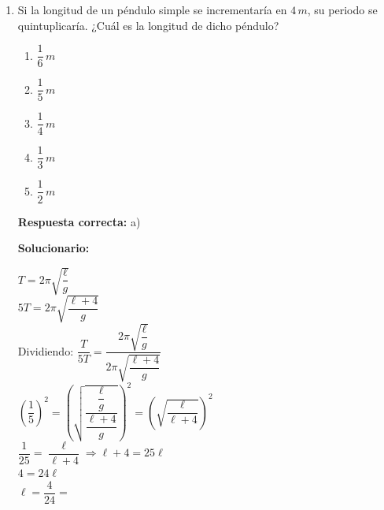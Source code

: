 \begin{enumerate}[resume]
	\textbf{Respuesta correcta:} d)
	
	\vspace{2mm}
	\textbf{Solucionario:}
	
	$Q = C_e \cdot m \cdot \Delta T$ 
	
	$Q = \left( 1 \, \dfrac{cal}{g \cdot ^\circ C} \right) (1,000 \, g) (90 - 10) \, ^\circ C$
	
	$Q = 80 \times 10^3 \, cal$ 
	
	$Q = 8 \times 10^4 \times 4.2 \, J$
	
	$Q = 33.6 \times 10^4 \, J$
	
	$Q = 336 \, kJ$ 
	
	$P = \dfrac{Q}{t} \Rightarrow t = \dfrac{Q}{P} = \dfrac{336 \, kJ}{420 \, W}$ 
	
	$t = \dfrac{8 \times 10^3 \times 4.2 \times 10}{420} =$

	\vspace{6mm}


\item Si la longitud de un péndulo simple se incrementaría en $4 \, m$, su periodo se quintuplicaría. ¿Cuál es la longitud de dicho péndulo?

\begin{enumerate}[label=\alph*)]
	\item $\dfrac{1}{6}\, m$
	\item $\dfrac{1}{5}\, m$
	\item $\dfrac{1}{4}\, m$
	\item $\dfrac{1}{3}\, m$
	\item $\dfrac{1}{2}\, m$
\end{enumerate}

\textbf{Respuesta correcta:} a)

\vspace{2mm}
\textbf{Solucionario:}

$T = 2\pi \sqrt{\dfrac{\ell}{g}}$ \\
$5T = 2\pi \sqrt{\dfrac{\ell + 4}{g}}$ \\

Dividiendo:
$\dfrac{T}{5T} = \dfrac{2\pi \sqrt{\dfrac{\ell}{g}}}{2\pi \sqrt{\dfrac{\ell + 4}{g}}}$ \\

$\left( \dfrac{1}{5} \right)^2 = \left( \sqrt{\dfrac{\dfrac{\ell}{g}}{\dfrac{\ell + 4}{g}}} \right)^2 = \left( \sqrt{\dfrac{\ell}{\ell + 4}} \right)^2$ \\

$\dfrac{1}{25} = \dfrac{\ell}{\ell + 4} \Rightarrow \ell + 4 = 25\ell$ \\

$4 = 24\ell$ \\

$\ell = \dfrac{4}{24} =$

\vspace{6mm}
\end{enumerate}



